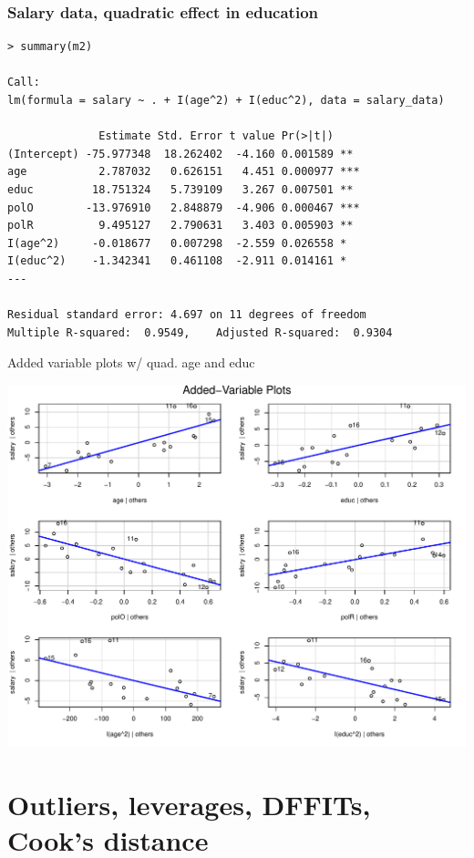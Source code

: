 \documentclass{beamer}
\begin{document}
\begin{frame}[fragile]
\frametitle{Salary data, quadratic effect in education}
\begin{footnotesize}
\begin{verbatim}
> summary(m2)

Call:
lm(formula = salary ~ . + I(age^2) + I(educ^2), data = salary_data)

              Estimate Std. Error t value Pr(>|t|)    
(Intercept) -75.977348  18.262402  -4.160 0.001589 ** 
age           2.787032   0.626151   4.451 0.000977 ***
educ         18.751324   5.739109   3.267 0.007501 ** 
polO        -13.976910   2.848879  -4.906 0.000467 ***
polR          9.495127   2.790631   3.403 0.005903 ** 
I(age^2)     -0.018677   0.007298  -2.559 0.026558 *  
I(educ^2)    -1.342341   0.461108  -2.911 0.014161 *  
---

Residual standard error: 4.697 on 11 degrees of freedom
Multiple R-squared:  0.9549,	Adjusted R-squared:  0.9304 
\end{verbatim}
\end{footnotesize}
\end{frame}


\begin{frame}{Added variable plots w/ quad. age and educ}
\begin{center}
\includegraphics[height=.85\textheight]{plots/salary_av3.pdf}        
\end{center}
\end{frame}

\section{Outliers, leverages, DFFITs, Cook's distance}
\end{document}
